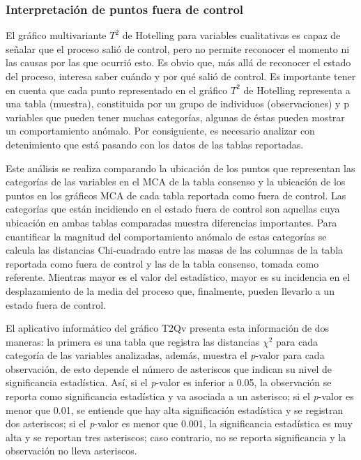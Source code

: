 \documentclass[water,article,submit,moreauthors,pdftex]{mdpi}
\begin{document}
\hypertarget{interpretaciuxf3n-de-puntos-fuera-de-control}{%
\subsubsection{Interpretación de puntos fuera de
control}\label{interpretaciuxf3n-de-puntos-fuera-de-control}}

El gráfico multivariante \(T^2\) de Hotelling para variables
cualitativas es capaz de señalar que el proceso salió de control, pero
no permite reconocer el momento ni las causas por las que ocurrió esto.
Es obvio que, más allá de reconocer el estado del proceso, interesa
saber cuándo y por qué salió de control. Es importante tener en cuenta
que cada punto representado en el gráfico \(T^2\) de Hotelling
representa a una tabla (muestra), constituida por un grupo de individuos
(observaciones) y p variables que pueden tener muchas categorías,
algunas de éstas pueden mostrar un comportamiento anómalo. Por
consiguiente, es necesario analizar con detenimiento que está pasando
con los datos de las tablas reportadas.

Este análisis se realiza comparando la ubicación de los puntos que
representan las categorías de las variables en el MCA de la tabla
consenso y la ubicación de los puntos en los gráficos MCA de cada tabla
reportada como fuera de control. Las categorías que están incidiendo en
el estado fuera de control son aquellas cuya ubicación en ambas tablas
comparadas muestra diferencias importantes. Para cuantificar la magnitud
del comportamiento anómalo de estas categorías se calcula las distancias
Chi-cuadrado entre las masas de las columnas de la tabla reportada como
fuera de control y las de la tabla consenso, tomada como referente.
Mientras mayor es el valor del estadístico, mayor es su incidencia en el
desplazamiento de la media del proceso que, finalmente, pueden llevarlo
a un estado fuera de control.

El aplicativo informático del gráfico T2Qv presenta esta información de
dos maneras: la primera es una tabla que registra las distancias
\(\chi^2\) para cada categoría de las variables analizadas, además,
muestra el \emph{p}-valor para cada observación, de esto depende el
número de asteriscos que indican su nivel de significancia estadística.
Así, si el \emph{p}-valor es inferior a 0.05, la observación se reporta
como significancia estadística y va asociada a un asterisco; si el
\emph{p}-valor es menor que 0.01, se entiende que hay alta significación
estadística y se registran dos asteriscos; si el \emph{p}-valor es menor
que 0.001, la significancia estadística es muy alta y se reportan tres
asteriscos; caso contrario, no se reporta significancia y la observación
no lleva asteriscos.
\end{document}
